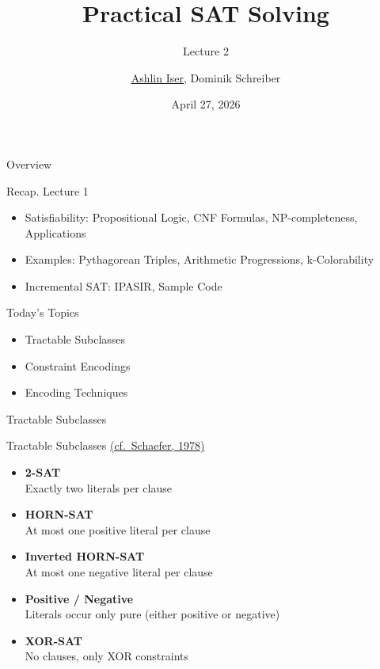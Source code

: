 \documentclass[t]{sdqbeamer}
\title{Practical SAT Solving}
\subtitle{Lecture 2 \unimp{\normalfont --  Tractable Subclasses, Encodings}}
\author{\underline{Ashlin Iser}, Dominik Schreiber}
\date{April 27, 2026}
\begin{document}
\begin{frame}[title white horizontal, picture=logos/blender-render, kitlogo=rgb]
	\titlepage
\end{frame}

\begin{frame}{Overview}
	\begin{block}{Recap. Lecture 1}
		\begin{itemize}\setlength{\itemsep}{1em}
			\item Satisfiability: Propositional Logic, CNF Formulas, NP-completeness, Applications
			\item Examples: Pythagorean Triples, Arithmetic Progressions, k-Colorability
			\item Incremental SAT: IPASIR, Sample Code
		\end{itemize}
	\end{block}
	\begin{block}{Today's Topics}
		\begin{itemize}\setlength{\itemsep}{1em}
			\item Tractable Subclasses
			\item Constraint Encodings
			\item Encoding Techniques
		\end{itemize}
	\end{block}
\end{frame}

\begin{frame}{Tractable Subclasses}
\pause
\begin{block}{Tractable Subclasses \href{https://doi.org/10.1145/800133.804350}{(cf.~Schaefer, 1978)}}
	\begin{itemize}\setlength{\itemsep}{1em}
		\item \textbf{2-SAT}\\Exactly two literals per clause
		\item \textbf{HORN-SAT}\\At most one positive literal per clause
		\item \textbf{Inverted HORN-SAT}\\At most one negative literal per clause
		\item \textbf{Positive / Negative}\\Literals occur only pure (either positive or negative)
		\item \textbf{XOR-SAT}\\No clauses, only XOR constraints
	\end{itemize}
\end{block}
\end{frame}
\end{document}
